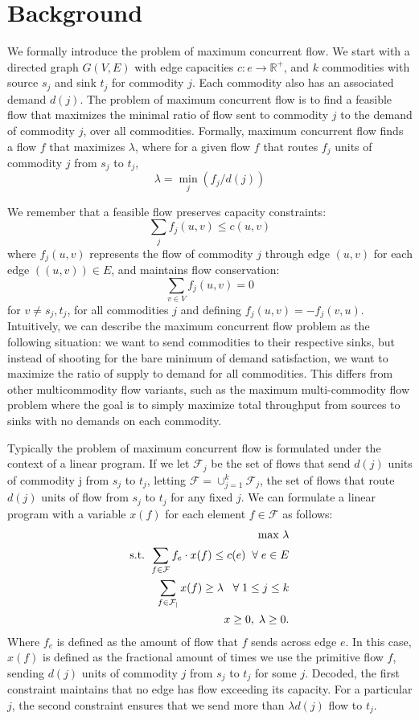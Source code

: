 \section{Background}
We formally introduce the problem of maximum concurrent flow. We
start with a directed graph $G(V,E)$ with edge capacities 
$c: e \rightarrow \mathbb{R}^+$,
 and $k$ commodities with source $s_j$ and sink $t_j$ for
commodity $j$. Each commodity also has an associated demand
$d(j)$. The problem of maximum concurrent flow is to find a feasible
flow that maximizes the minimal ratio of flow sent to commodity $j$ to the
demand of commodity $j$, over all commodities. Formally, maximum
concurrent flow finds a flow $f$ that maximizes $\lambda$, where for a given flow $f$ that routes $f_j$
units of commodity $j$ from $s_j$ to $t_j$, 
$$\lambda = \min_{j}(f_j/d(j))$$

We remember that a feasible flow preserves capacity constraints: 
$$\sum_j f_j(u,v) \leq c(u,v)$$
where $f_j(u,v)$ represents the flow of commodity $j$ through edge
$(u,v)$ for each edge $((u,v))\in E$, and maintains flow conservation:
$$\sum_{v\in V} f_j(u,v)=0$$ 
for $v\neq s_j,t_j$, for all commodities $j$ and defining
$f_j(u,v)=-f_j(v,u)$. Intuitively, we can describe the maximum
concurrent flow problem as the following situation: we want to send
commodities to their respective sinks, but instead of shooting for the
bare minimum of demand satisfaction, we want to maximize the ratio of
supply to demand for all commodities. This differs from other
multicommodity flow variants, such as the maximum multi-commodity flow
problem where the goal is to simply maximize total throughput from
sources to sinks with no demands on each commodity.

Typically the problem of maximum concurrent flow is formulated under the context of a linear
program. If we let $\mathcal{F}_j$ be the set of flows that send $d(j)$ units
of commodity j from $s_j$ to $t_j$, letting
 $\mathcal{F}=\cup_{j=1}^k \mathcal{F}_j$, the set of flows that route
$d(j)$ units of flow from $s_j$ to $t_j$ for any fixed $j$. We can
formulate a linear program with a variable $x(f)$ for each element
$f\in \mathcal{F}$ as follows:
\begin{align*}
\text{max     } \lambda \\
\text{s.t. }\sum_{f\in \cal{F}}f_e\cdot x(f) \leq c(e) \;\;\forall\;
e\in E \\
\sum_{f\in \cal{F}_j} x(f)\geq \lambda \;\;\;\forall\; 1\leq j\leq k \\
x\geq 0,\; \lambda\geq 0.
\end{align*}
Where $f_e$ is defined as the amount of flow that $f$ sends across edge $e$. In this case, $x(f)$ is defined as the fractional amount of times we use the
primitive flow $f$, sending $d(j)$ units of commodity $j$ from $s_j$
to $t_j$ for some $j$. Decoded, the first constraint maintains that no
edge has flow exceeding its capacity. For a particular $j$, the second
constraint ensures that we send more than $\lambda d(j)$ flow to
$t_j$. 

